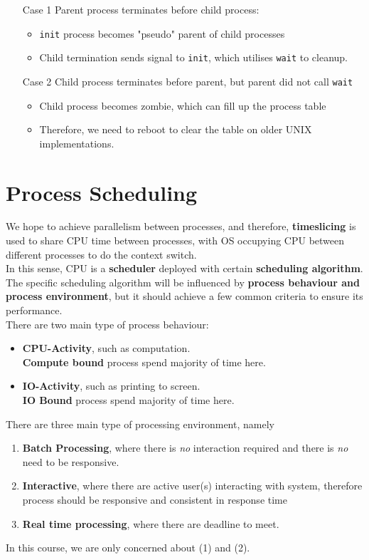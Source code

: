 \documentclass[11pt]{article}
\theoremstyle{definition}
\begin{document}
\begin{itemize}[itemsep=0pt]
  \item[Case 1] Parent process terminates before child process:
  \begin{itemize}[itemsep=0pt]
    \item \texttt{init} process becomes "pseudo" parent of child processes
    \item Child termination sends signal to \texttt{init}, which utilises \texttt{wait} to cleanup.
  \end{itemize}
  \item[Case 2] Child process terminates before parent, but parent did not call \texttt{wait}
  \begin{itemize}[itemsep=0pt]
    \item Child process becomes zombie, which can fill up the process table
    \item Therefore, we need to reboot to clear the table on older UNIX implementations.
  \end{itemize}
\end{itemize}
\section{Process Scheduling}
We hope to achieve parallelism between processes, and therefore, \textbf{timeslicing} is used to share CPU time between processes, with OS occupying CPU between different processes to do the context switch.\\
In this sense, CPU is a \textbf{scheduler} deployed with certain \textbf{scheduling algorithm}. The specific scheduling algorithm will be influenced by \textbf{process behaviour and process environment}, but it should achieve a few common criteria to ensure its performance.\\

There are two main type of process behaviour:
\begin{itemize}[itemsep=0pt]
  \item \textbf{CPU-Activity}, such as computation. \\\textbf{Compute bound} process spend majority of time here.
  \item \textbf{IO-Activity}, such as printing to screen.\\\textbf{IO Bound} process spend majority of time here.
\end{itemize}
There are three main type of processing environment, namely
\begin{enumerate}
  \item \textbf{Batch Processing}, where there is \textit{no} interaction required and there is \textit{no} need to be responsive.
  \item \textbf{Interactive}, where there are active user(s) interacting with system, therefore process should be responsive and consistent in response time
  \item \textbf{Real time processing}, where there are deadline to meet.
\end{enumerate}
In this course, we are only concerned about (1) and (2).\\
\end{document}
